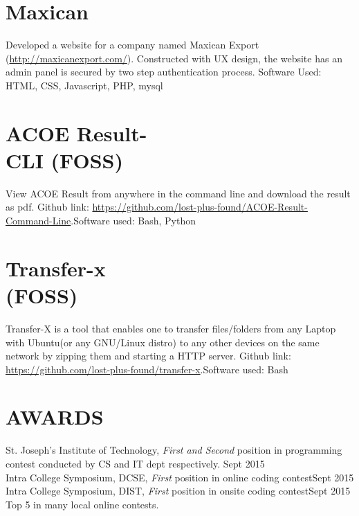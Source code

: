 \documentclass[margin, 10pt]{res} %
\begin{document}
\begin{resume}
\section{ \hspace{05pt} Maxican}
Developed a website for a company named Maxican Export (\href{http://maxicanexport.com/}{http://maxicanexport.com/}). Constructed with UX design, the website has an admin panel is secured by two step authentication process. Software Used: HTML, CSS, Javascript, PHP, mysql
\section{ \hspace{05pt} ACOE Result-\\ \hspace{05pt} CLI (FOSS)}
View ACOE Result from anywhere in the command line and download the result as pdf. Github link: \href{https://github.com/lost-plus-found/ACOE-Result-Command-Line}{https://github.com/lost-plus-found/ACOE-Result-Command-Line}.Software used: Bash, Python
\section{ \hspace{05pt} Transfer-x\\ \hspace{05pt} (FOSS)}
Transfer-X is a tool that enables one to transfer files/folders from any Laptop with Ubuntu(or any GNU/Linux distro) to any other devices on the same network by zipping them and starting a HTTP server. Github link: \href{https://github.com/lost-plus-found/transfer-x}{https://github.com/lost-plus-found/transfer-x}.Software used: Bash\\


\section{AWARDS}

St. Joseph's Institute of Technology, {\sl First and Second} position in programming contest conducted by CS and IT dept respectively. \hfill Sept 2015\\
Intra College Symposium, DCSE, {\sl First} position in online coding contest\hfill Sept 2015\\
Intra College Symposium, DIST, {\sl First} position in onsite coding contest\hfill Sept 2015\\
Top 5 in many local online contests.


\end{resume}
\end{document}
